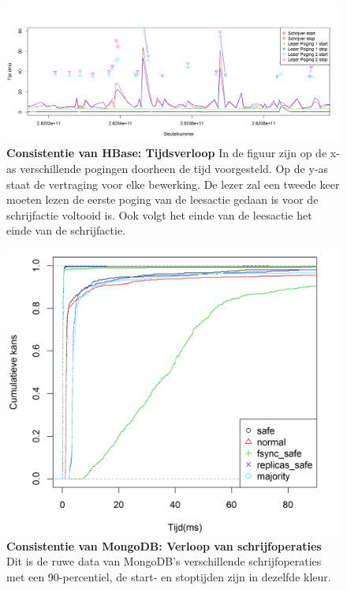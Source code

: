 \begin{figure}[ht!] 
	\centering
	\includegraphics[width=\textwidth]{img/Observaties/HBase/consistency-plot-R-1-insertRawData-5}

	\caption{\textbf{Consistentie van HBase: Tijdsverloop} \newline
 	In de figuur zijn op de x-as verschillende pogingen doorheen de tijd voorgesteld. Op de y-as staat de vertraging voor elke bewerking. De lezer zal een tweede keer moeten lezen de eerste poging van de leesactie gedaan is voor de schrijfactie voltooid is. Ook volgt het einde van de leesactie het einde van de schrijfactie. }
	\label{fig:consistentie-hbase-tijdschaal-lezer-1}
\end{figure}

\begin{figure}[htb!] 
	\centering
	\includegraphics[width=.7\textwidth]{img/Observaties/MongoDB/ECDF-Compare-Write-insert-1}
	\caption{\textbf{Consistentie van MongoDB: Verloop van schrijfoperaties} \newline
	Dit is de ruwe data van MongoDB's verschillende schrijfoperaties met een 90-percentiel, de start- en stoptijden zijn in dezelfde kleur.  }
	\label{fig:consistentie-mongodb-all-mongodb-write}
\end{figure}

